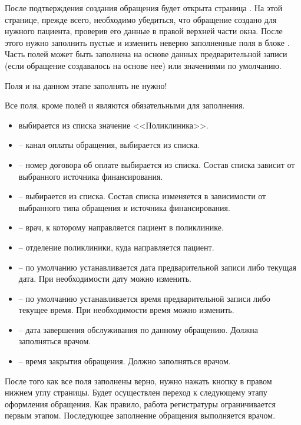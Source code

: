 После подтверждения создания обращения будет открыта страница . На этой странице, прежде всего, необходимо убедиться, что обращение создано для нужного пациента, проверив его данные в правой верхней части окна. После этого нужно заполнить пустые и изменить неверно заполненные поля в блоке . Часть полей может быть заполнена на основе данных предварительной записи (если обращение создавалось на основе нее) или значениями по умолчанию.

\begin{vnim}
 Поля  и  на данном этапе заполнять не нужно!
\end{vnim}

Все поля, кроме полей  и  являются обязательными для заполнения.
\begin{itemize}
 \item {} выбирается из списка значение <<Поликлиника>>.
 \item {} – канал оплаты обращения, выбирается из списка.
 \item {} – номер договора об оплате выбирается из списка. Состав списка зависит от выбранного источника финансирования.
 \item {} – выбирается из списка. Состав списка изменяется в зависимости от выбранного типа обращения и источника финансирования.
 \item {} – врач, к которому направляется пациент в поликлинике.
 \item {} – отделение поликлиники, куда направляется пациент.
 \item {} – по умолчанию устанавливается дата предварительной записи либо текущая дата. При необходимости дату можно изменить.
 \item {} – по умолчанию устанавливается время предварительной записи либо текущее время. При необходимости время можно изменить.
 \item {} – дата завершения обслуживания по данному обращению. Должна заполняться врачом.
 \item {} – время закрытия обращения. Должно заполняться врачом.
\end{itemize}

После того как все поля заполнены верно, нужно нажать кнопку  в правом нижнем углу страницы. Будет осуществлен переход к следующему этапу оформления обращения. Как правило, работа регистратуры ограничивается первым этапом. Последующее заполнение обращения выполняется врачом.

